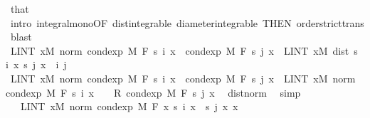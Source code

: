 \begin{isabellebody}
\ that\ {\isacharasterisk}{\kern0pt}\ \isamarkupfalse%
\ {\isacharparenleft}{\kern0pt}intro\ integral{\isacharunderscore}{\kern0pt}mono{\isacharbrackleft}{\kern0pt}OF\ dist{\isacharunderscore}{\kern0pt}integrable\ diameter{\isacharunderscore}{\kern0pt}integrable{\isacharcomma}{\kern0pt}\ THEN\ order{\isachardot}{\kern0pt}strict{\isacharunderscore}{\kern0pt}trans{}{\isacharbrackright}{\kern0pt}{\isacharcomma}{\kern0pt}\ blast{\isacharplus}{\kern0pt}{\isacharparenright}{\kern0pt}\isanewline
\ \ \ \ \isamarkupfalse%
\ \isamarkupfalse%
\ {\isachardoublequoteopen}LINT\ x{\isacharbar}{\kern0pt}M{\isachardot}{\kern0pt}\ norm\ {\isacharparenleft}{\kern0pt}cond{\isacharunderscore}{\kern0pt}exp\ M\ F\ {\isacharparenleft}{\kern0pt}s\ i{\isacharparenright}{\kern0pt}\ x\ {\isacharminus}{\kern0pt}\ cond{\isacharunderscore}{\kern0pt}exp\ M\ F\ {\isacharparenleft}{\kern0pt}s\ j{\isacharparenright}{\kern0pt}\ x{\isacharparenright}{\kern0pt}\ {\isasymle}\ LINT\ x{\isacharbar}{\kern0pt}M{\isachardot}{\kern0pt}\ dist\ {\isacharparenleft}{\kern0pt}s\ i\ x{\isacharparenright}{\kern0pt}\ {\isacharparenleft}{\kern0pt}s\ j\ x{\isacharparenright}{\kern0pt}{\isachardoublequoteclose}\ \ i\ j\isanewline
\ \ \ \ \isamarkupfalse%
\ {\isacharminus}{\kern0pt}\isanewline
\ \ \ \ \ \ \isamarkupfalse%
\ {\isachardoublequoteopen}LINT\ x{\isacharbar}{\kern0pt}M{\isachardot}{\kern0pt}\ norm\ {\isacharparenleft}{\kern0pt}cond{\isacharunderscore}{\kern0pt}exp\ M\ F\ {\isacharparenleft}{\kern0pt}s\ i{\isacharparenright}{\kern0pt}\ x\ {\isacharminus}{\kern0pt}\ cond{\isacharunderscore}{\kern0pt}exp\ M\ F\ {\isacharparenleft}{\kern0pt}s\ j{\isacharparenright}{\kern0pt}\ x{\isacharparenright}{\kern0pt}\ {\isacharequal}{\kern0pt}\ LINT\ x{\isacharbar}{\kern0pt}M{\isachardot}{\kern0pt}\ norm\ {\isacharparenleft}{\kern0pt}cond{\isacharunderscore}{\kern0pt}exp\ M\ F\ {\isacharparenleft}{\kern0pt}s\ i{\isacharparenright}{\kern0pt}\ x\ {\isacharplus}{\kern0pt}\ {\isacharminus}{\kern0pt}\ {}\ {\isacharasterisk}{\kern0pt}\isactrlsub R\ cond{\isacharunderscore}{\kern0pt}exp\ M\ F\ {\isacharparenleft}{\kern0pt}s\ j{\isacharparenright}{\kern0pt}\ x{\isacharparenright}{\kern0pt}{\isachardoublequoteclose}\ \isamarkupfalse%
\ dist{\isacharunderscore}{\kern0pt}norm\ \isamarkupfalse%
\ simp\isanewline
\ \ \ \ \ \ \isamarkupfalse%
\ \isamarkupfalse%
\ {\isachardoublequoteopen}{\isachardot}{\kern0pt}{\isachardot}{\kern0pt}{\isachardot}{\kern0pt}\ {\isacharequal}{\kern0pt}\ LINT\ x{\isacharbar}{\kern0pt}M{\isachardot}{\kern0pt}\ norm\ {\isacharparenleft}{\kern0pt}cond{\isacharunderscore}{\kern0pt}exp\ M\ F\ {\isacharparenleft}{\kern0pt}{\isasymlambda}x{\isachardot}{\kern0pt}\ s\ i\ x\ {\isacharminus}{\kern0pt}\ s\ j\ x{\isacharparenright}{\kern0pt}\ x{\isacharparenright}{\kern0pt}{\isachardoublequoteclose}\ \isamarkupfalse%

\end{isabellebody}

